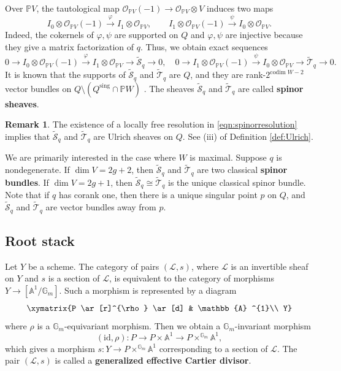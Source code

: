 \documentclass[12pt, letterpaper]{amsart}
\theoremstyle{definition}
\newtheorem{remark}[theorem]{Remark}
\renewcommand{\AA}{\mathbb{A} }
\newcommand{\GG}{\mathbb{G} }
\newcommand{\PP}{\mathbb{P} }
\newcommand{\cL}{\mathcal{L} }
\newcommand{\cO}{\mathcal{O} }
\newcommand{\cS}{\mathcal{S} }
\newcommand{\cT}{\mathcal{T} }
\newcommand{\tcS}{\widetilde{\cS} }
\def\codim{\mathrm{codim}}
\begin{document}
Over \(\PP V\), the tautological map \(\cO_{\PP V}(-1) \to \cO_{\PP V}\otimes V\) induces two maps
\begin{equation}\label{eqn:tautologicalmaps}
I_0 \otimes \cO_{\PP V}(-1) \stackrel{\varphi}{\to} I_1 \otimes \cO_{\PP V}, \qquad I_1 \otimes \cO_{\PP V}(-1) \stackrel{\psi}{\to} I_0 \otimes \cO_{\PP V}.
\end{equation}
Indeed, the cokernels of \(\varphi, \psi\) are supported on \(Q\) and \(\varphi, \psi\) are injective because they give a matrix factorization of \(q\). Thus, we obtain exact sequences
\begin{equation}\label{eqn:spinorresolution}
0 \to I_0 \otimes \cO_{\PP V}(-1) \stackrel{\varphi}{\to} I_1 \otimes \cO_{\PP V} \to \tcS_q \to 0, \quad 0 \to I_1 \otimes \cO_{\PP V}(-1) \stackrel{\psi}{\to} I_0 \otimes \cO_{\PP V} \to \widetilde{\cT}_q \to 0.
\end{equation}
It is known that the supports of \(\tcS_q\) and \(\widetilde{\cT}_q\) are \(Q\), and they are rank-\(2^{\codim\; W - 2}\) vector bundles on \(Q \setminus (Q^{\mathrm{sing}} \cap \PP W)\) \cite[Proposition~2.1]{Add11}. The sheaves \(\tcS_q\) and \(\widetilde{\cT}_q\) are called \textbf{spinor sheaves}.

\begin{remark}\label{rmk:Ulrichquadric}
The existence of a locally free resolution in \eqref{eqn:spinorresolution} implies that \(\tcS_q\) and \(\widetilde{\cT}_q\) are Ulrich sheaves on \(Q\). See (iii) of Definition \ref{def:Ulrich}.
\end{remark}

We are primarily interested in the case where \(W\) is maximal. Suppose \(q\) is nondegenerate. If \(\dim V = 2g+2\), then \(\tcS_q\) and \(\widetilde{\cT}_q\) are two classical \textbf{spinor bundles}. If \(\dim V = 2g+1\), then \(\tcS_q \cong \widetilde{\cT}_q\) is the unique classical spinor bundle. Note that if \(q\) has corank one, then there is a unique singular point \(p\) on \(Q\), and \(\tcS_q\) and \(\widetilde{\cT}_q\) are vector bundles away from \(p\).

\subsection{Root stack}\label{ssec:rootstack}

Let \(Y\) be a scheme. The category of pairs \((\cL, s)\), where \(\cL\) is an invertible sheaf on \(Y\) and \(s\) is a section of \(\cL\), is equivalent to the category of morphisms \(Y \to [\AA^{1}/\GG_{m}]\). Such a morphism is represented by a diagram
\[\xymatrix{P \ar[r]^{\rho} \ar[d] & \AA^{1}\\ Y}\]
where \(\rho\) is a \(\GG_{m}\)-equivariant morphism. Then we obtain a \(\GG_{m}\)-invariant morphism
\[(\mathrm{id}, \rho) : P \to P \times \AA^{1} \to P \times^{\GG_{m}}\AA^{1},\]
which gives a morphism \(s : Y \to P \times^{\GG_{m}}\AA^{1}\) corresponding to a section of \(\cL\). The pair \((\cL, s)\) is called a \textbf{generalized effective Cartier divisor}.
\end{document}
